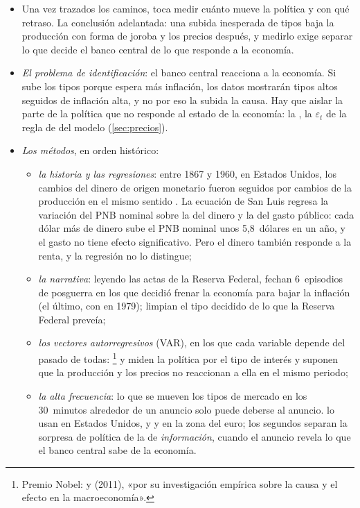\documentclass[11pt]{article}
\begin{document}
\begin{itemize}
\item Una vez trazados los caminos, toca medir cuánto mueve la política y con qué retraso. La conclusión adelantada: una subida inesperada de tipos baja la producción con forma de joroba y los precios después, y medirlo exige separar lo que decide el banco central de lo que responde a la economía.
\item \emph{El problema de identificación}: el banco central reacciona a la economía. Si sube los tipos porque espera más inflación, los datos mostrarán tipos altos seguidos de inflación alta, y no por eso la subida la causa. Hay que aislar la parte de la política que no responde al estado de la economía: la , la $\varepsilon_t$ de la regla de  del modelo (\ref{sec:precios}).
\item \emph{Los métodos}, en orden histórico:
  \begin{itemize}
  \item \emph{la historia y las regresiones}: entre 1867 y 1960, en Estados Unidos, los cambios del dinero de origen monetario fueron seguidos por cambios de la producción en el mismo sentido\nocite{FriedmanSchwartz1963Monetary} . La ecuación de San Luis regresa la variación del PNB nominal sobre la del dinero y la del gasto público: cada dólar más de dinero sube el PNB nominal unos 5,8~dólares en un año, y el gasto no tiene efecto significativo\nocite{AndersenJordan1968Monetary}. Pero el dinero también responde a la renta, y la regresión no lo distingue;
  \item \emph{la narrativa}: leyendo las actas de la Reserva Federal, \textcite{RomerRomer1989Does} fechan 6~episodios de posguerra en los que decidió frenar la economía para bajar la inflación (el último, con  en 1979); \textcite{RomerRomer2004New} limpian el tipo decidido de lo que la Reserva Federal preveía;
  \item \emph{los vectores autorregresivos} (VAR), en los que cada variable depende del pasado de todas: \textcite{Sims1992Interpreting}\footnote{Premio Nobel:  y  (2011), «por su investigación empírica sobre la causa y el efecto en la macroeconomía»\nocite{Nobel2011SargentSims}.} y \textcite{ChristianoEichenbaumEvans1996Effects} miden la política por el tipo de interés y suponen que la producción y los precios no reaccionan a ella en el mismo periodo;
  \item \emph{la alta frecuencia}: lo que se mueven los tipos de mercado en los 30~minutos alrededor de un anuncio solo puede deberse al anuncio. \textcite{GertlerKaradi2015} lo usan en Estados Unidos, y \textcite{AltavillaEtAl2019} y \textcite{JarocinskiKaradi2020} en la zona del euro; los segundos separan la sorpresa de política de la de \emph{información}, cuando el anuncio revela lo que el banco central sabe de la economía.
  \end{itemize}
\end{itemize}
\end{document}
